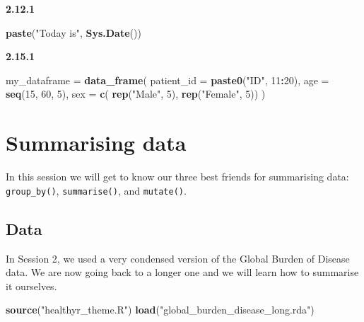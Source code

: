 \documentclass[12pt,]{krantz}
\makeatletter
\newenvironment{Shaded}{\begin{snugshade}}{\end{snugshade}}
\newcommand{\DataTypeTok}[1]{\textcolor[rgb]{0.13,0.29,0.53}{#1}}
\newcommand{\DecValTok}[1]{\textcolor[rgb]{0.00,0.00,0.81}{#1}}
\newcommand{\KeywordTok}[1]{\textcolor[rgb]{0.13,0.29,0.53}{\textbf{#1}}}
\newcommand{\NormalTok}[1]{#1}
\newcommand{\OperatorTok}[1]{\textcolor[rgb]{0.81,0.36,0.00}{\textbf{#1}}}
\newcommand{\StringTok}[1]{\textcolor[rgb]{0.31,0.60,0.02}{#1}}
\newenvironment{kframe}{%
\medskip{}
\setlength{\fboxsep}{.8em}
 \def\at@end@of@kframe{}%
 \ifinner\ifhmode%
  \def\at@end@of@kframe{\end{minipage}}%
  \begin{minipage}{\columnwidth}%
 \fi\fi%
 \def\FrameCommand##1{\hskip\@totalleftmargin \hskip-\fboxsep
 \colorbox{shadecolor}{##1}\hskip-\fboxsep
     \hskip-\linewidth \hskip-\@totalleftmargin \hskip\columnwidth}%
 \MakeFramed {\advance\hsize-\width
   \@totalleftmargin\z@ \linewidth\hsize
   \@setminipage}}%
 {\par\unskip\endMakeFramed%
 \at@end@of@kframe}
\renewenvironment{Shaded}{\begin{kframe}}{\end{kframe}}
\theoremstyle{definition}
\theoremstyle{definition}
\theoremstyle{definition}
\theoremstyle{remark}
\makeatother
\begin{document}
\textbf{2.12.1}

\begin{Shaded}
\begin{Highlighting}[]
\KeywordTok{paste}\NormalTok{(}\StringTok{"Today is"}\NormalTok{, }\KeywordTok{Sys.Date}\NormalTok{())}
\end{Highlighting}
\end{Shaded}

\textbf{2.15.1}

\begin{Shaded}
\begin{Highlighting}[]
\NormalTok{my_dataframe =}\StringTok{ }\KeywordTok{data_frame}\NormalTok{(}
  \DataTypeTok{patient_id =} \KeywordTok{paste0}\NormalTok{(}\StringTok{"ID"}\NormalTok{, }\DecValTok{11}\OperatorTok{:}\DecValTok{20}\NormalTok{),}
  \DataTypeTok{age        =} \KeywordTok{seq}\NormalTok{(}\DecValTok{15}\NormalTok{, }\DecValTok{60}\NormalTok{, }\DecValTok{5}\NormalTok{),}
  \DataTypeTok{sex        =} \KeywordTok{c}\NormalTok{( }\KeywordTok{rep}\NormalTok{(}\StringTok{"Male"}\NormalTok{, }\DecValTok{5}\NormalTok{), }\KeywordTok{rep}\NormalTok{(}\StringTok{"Female"}\NormalTok{, }\DecValTok{5}\NormalTok{))}
\NormalTok{)}
\end{Highlighting}
\end{Shaded}

\hypertarget{summarising-data}{%
\chapter{Summarising data}\label{summarising-data}}

In this session we will get to know our three best friends for
summarising data: \texttt{group\_by()}, \texttt{summarise()}, and
\texttt{mutate()}.

\hypertarget{data-1}{%
\section{Data}\label{data-1}}

In Session 2, we used a very condensed version of the Global Burden of
Disease data. We are now going back to a longer one and we will learn
how to summarise it ourselves.

\begin{Shaded}
\begin{Highlighting}[]
\KeywordTok{source}\NormalTok{(}\StringTok{"healthyr_theme.R"}\NormalTok{)}
\KeywordTok{load}\NormalTok{(}\StringTok{"global_burden_disease_long.rda"}\NormalTok{)}
\end{Highlighting}
\end{Shaded}
\end{document}
